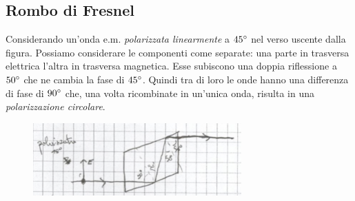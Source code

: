 \documentclass{article}
\begin{document}
\subsection{Rombo di Fresnel}
Considerando un'onda e.m. \textit{polarizzata linearmente} a $45\degree$ nel verso uscente dalla figura. Possiamo considerare le componenti come separate: una parte in trasversa elettrica l'altra in trasversa magnetica. Esse subiscono una doppia riflessione a $50\degree$ che ne cambia la fase di $45\degree$. Quindi tra di loro le onde hanno una differenza di fase di $90\degree$ che, una volta ricombinate in un'unica onda, risulta in una \textit{polarizzazione circolare}.
\begin{figure}[H]
\includegraphics[width=8cm]{images/rombo_fresnel.png}
\centering
\end{figure}

\newpage
\end{document}
